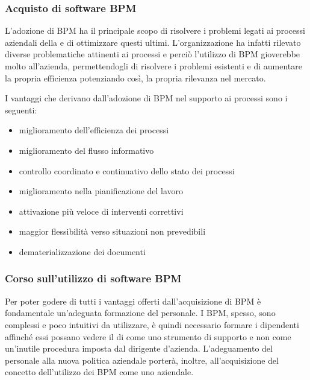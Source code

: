 	
    \subsubsection{Acquisto di software BPM}
    
    L'adozione di  BPM ha il principale scopo di risolvere i problemi legati ai processi aziendali della \customer e di ottimizzare questi ultimi. L'organizzazione ha infatti rilevato diverse problematiche attinenti ai processi e perciò l'utilizzo di \sw BPM gioverebbe molto all'azienda, permettendogli di risolvere i problemi esistenti e di aumentare la propria efficienza potenziando così, la propria rilevanza nel mercato.



I vantaggi che derivano dall'adozione di \sw BPM nel supporto ai processi sono i seguenti:

\begin{itemize}
	\item miglioramento dell'efficienza dei processi
	\item miglioramento del flusso informativo
	\item controllo coordinato e continuativo dello stato dei processi
	\item miglioramento nella pianificazione del lavoro
	\item attivazione più veloce di interventi correttivi
	\item maggior flessibilità verso situazioni non prevedibili
	\item dematerializzazione dei documenti 	
\end{itemize}


\subsubsection{Corso sull'utilizzo di software BPM}
Per poter godere di tutti i vantaggi offerti dall'acquisizione di \sw BPM è fondamentale un'adeguata formazione del personale. I \sw BPM, spesso, sono complessi e poco intuitivi da utilizzare, è quindi necessario formare i dipendenti affinché essi possano 
vedere il \sw di  come uno strumento di supporto e non come un'inutile procedura imposta dal dirigente d'azienda.
L'adeguamento del personale alla nuova politica aziendale porterà, inoltre, all'acquisizione del concetto dell'utilizzo dei \sw BPM come uno  aziendale.

